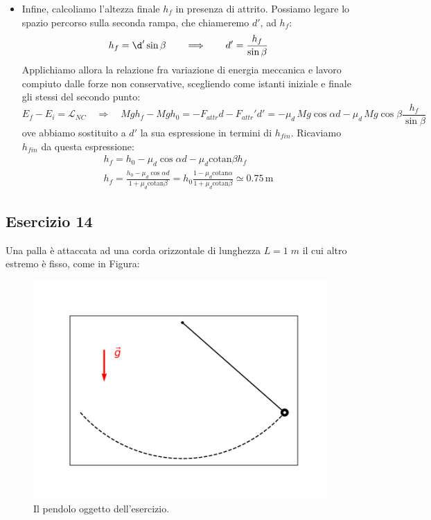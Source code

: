 \documentclass[12pt,a4paper]{book}
\begin{document}
\begin{itemize}
\item Infine, calcoliamo l'altezza finale $h_{f}$ in presenza di attrito. Possiamo legare lo spazio percorso sulla seconda rampa, che chiameremo $d'$, ad $h_{f}$:
\begin{equation*}
h_{f} = \d' \sin\beta\qquad \Longrightarrow \qquad d' = \frac{h_{f}}{\sin\beta}
\end{equation*}
Applichiamo allora la relazione fra variazione di energia meccanica e lavoro compiuto dalle forze non conservative, scegliendo come istanti iniziale e finale gli stessi del secondo punto:  
\begin{equation*}
E_{f} - E_{i} = \mathcal{L}
_{NC} \quad  \Rightarrow \quad Mg h_{f} - Mg h_0 = -F_{attr} d - F_{attr}'d' = -\mu_d \, Mg \cos\alpha d 
- \mu_d \, Mg \cos\beta \frac{h_{f}}{\sin\beta}
\end{equation*}
ove abbiamo sostituito a $d'$ la sua espressione in termini di $h_{fin}$. Ricaviamo $h_{fin}$ da questa espressione:\\
\begin{gather*}
h_{f}=h_0 -  \mu_d  \cos\alpha d - \mu_d \text{cotan}\beta h_{f} \\
h_{f}=\frac{h_0 -  \mu_d  \cos\alpha d}{1+ \mu_d \text{cotan}\beta } = h_0 \frac{1 -  \mu_d \text{cotan}\alpha }{1+ \mu_d \text{cotan}\beta } \simeq 0.75 \, \text{m}
\end{gather*}
\end{itemize}

\subsection*{Esercizio 14}
Una palla è attaccata ad una corda orizzontale di lunghezza $L=1\; m$ il cui altro estremo è fisso, come in Figura:
\begin{figure}[!ht]
\centering
\includegraphics[scale=0.5]{pendolo.pdf}
\caption{Il pendolo oggetto dell'esercizio. \label{fig:pendolo}}
\end{figure} 
\end{document}
